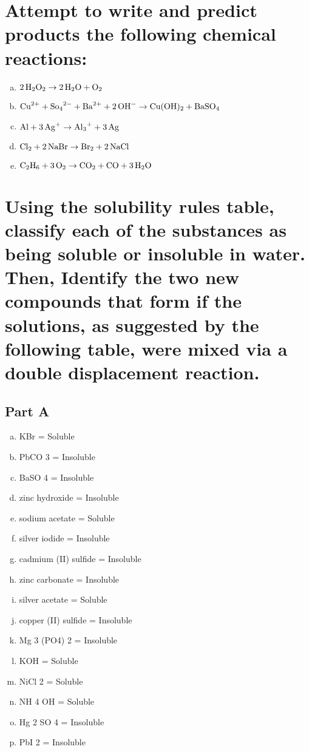 \documentclass{scrartcl}
\begin{document}
\section{Attempt to write and predict products the following chemical reactions:}
\label{sec:org529d35e}
\begin{enumerate}[a.]
\item \(\ce{2H2O2}\rightarrow\ce{2H2O + O2}\)
\item \(\ce{Cu^{2+} + So4^{2-} + Ba^{2+} + 2OH-}\rightarrow\ce{Cu(OH)2 + BaSO4}\)
\item \(\ce{Al + 3Ag+}\rightarrow\ce{Al3+ + 3Ag}\)
\item \(\ce{Cl2 + 2NaBr}\rightarrow\ce{Br2 + 2NaCl}\)
\item \(\ce{C2H6 + 3O2}\rightarrow\ce{CO2 + CO + 3H2O}\)
\end{enumerate}

\section{Using the solubility rules table, classify each of the substances as being soluble or insoluble in water. Then, Identify the two new compounds that form if the solutions, as suggested by the following table, were mixed via a double displacement reaction.}
\label{sec:org7ea08db}
\subsection{Part A}
\label{sec:orgdc4fc40}
\begin{enumerate}[a.]
\item KBr = Soluble
\item PbCO 3 = Insoluble
\item BaSO 4 = Insoluble
\item zinc hydroxide = Insoluble
\item sodium acetate = Soluble
\item silver iodide = Insoluble
\item cadmium (II) sulfide = Insoluble
\item zinc carbonate = Insoluble
\item silver acetate = Soluble
\item copper (II) sulfide = Insoluble
\item Mg 3 (PO4) 2 = Insoluble
\item KOH = Soluble
\item NiCl 2 = Soluble
\item NH 4 OH = Soluble
\item Hg 2 SO 4 = Insoluble
\item PbI 2 = Insoluble
\end{enumerate}
\end{document}
